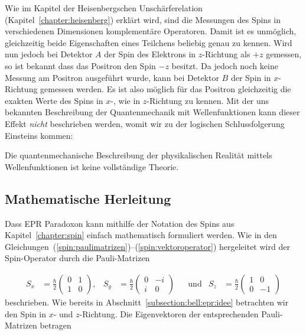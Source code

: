 \begin{refsection}
Wie im Kapitel der Heisenbergschen Unsch\"arferelation 
(Kapitel~\ref{chapter:heisenberg})
erkl\"art wird, sind die Messungen des Spins in verschiedenen Dimensionen 
komplement\"are Operatoren.
Damit ist es unm\"oglich, gleichzeitig beide Eigenschaften eines Teilchens
beliebig genau zu kennen.
Wird nun jedoch bei Detektor $A$ der Spin des Elektrons in $z$-Richtung 
als $+z$ gemessen, so ist bekannt dass das Positron den Spin $-z$ besitzt.
Da jedoch noch keine Messung am Positron ausgef\"uhrt wurde, kann bei
Detektor $B$ der Spin in $x$-Richtung gemessen werden.
Es ist also m\"oglich f\"ur das Positron gleichzeitig die exakten Werte 
des Spins in $x$-, wie in $z$-Richtung zu kennen. 
Mit der uns bekannten Beschreibung der Quantenmechanik mit Wellenfunktionen
kann dieser Effekt \emph{nicht} beschrieben werden, womit wir zu der
logischen Schlussfolgerung Einsteins kommen:

\begin{satz}
    Die quantenmechanische Beschreibung der physikalischen Realit\"at mittels
    Wellenfunktionen ist keine vollst\"andige Theorie.
\end{satz}

\subsection{Mathematische Herleitung\label{subsection:bell:epr:herleitung}}
Dass EPR Paradoxon kann mithilfe der Notation des Spins aus 
Kapitel~\ref{chapter:spin}  einfach mathematisch formuliert werden.
Wie in den Gleichungen~(\ref{spin:paulimatrizen})--(\ref{spin:vektoroperator})
hergeleitet wird der Spin-Operator durch die Pauli-Matrizen

\begin{align}
    S_x &= \frac{\hbar}{2} \begin{pmatrix}
    0 & 1 \\ 1 & 0
    \end{pmatrix},
    &
    S_y &= \frac{\hbar}{2} \begin{pmatrix}
    0 & -i \\ i & 0
    \end{pmatrix}
    &&\text{und}
    &
    S_z &= \frac{\hbar}{2} \begin{pmatrix}
    1 & 0 \\ 0 & -1
    \end{pmatrix}\label{equ:bell:paulimatrizen}
\end{align}
beschrieben.
Wie bereits in Abschnitt~\ref{subsection:bell:epr:idee} betrachten 
wir den Spin in $x$- und $z$-Richtung.
Die Eigenvektoren der entsprechenden Pauli-Matrizen betragen


\end{refsection}
